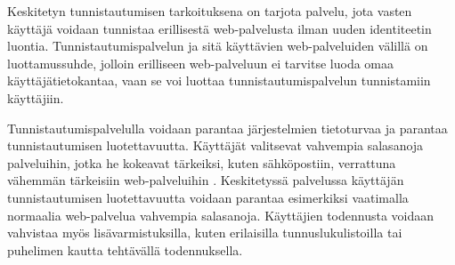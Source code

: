 Keskitetyn tunnistautumisen tarkoituksena on tarjota palvelu, jota vasten käyttäjä voidaan tunnistaa erillisestä web-palvelusta ilman uuden identiteetin luontia. Tunnistautumispalvelun ja sitä käyttävien web-palveluiden välillä on luottamussuhde, jolloin erilliseen web-palveluun ei tarvitse luoda omaa käyttäjätietokantaa, vaan se voi luottaa tunnistautumispalvelun tunnistamiin käyttäjiin.

Tunnistautumispalvelulla voidaan parantaa järjestelmien tietoturvaa ja parantaa tunnistautumisen luotettavuutta. Käyttäjät valitsevat vahvempia salasanoja palveluihin, jotka he kokeavat tärkeiksi, kuten sähköpostiin, verrattuna vähemmän tärkeisiin web-palveluihin \cite{password_habits}. Keskitetyssä palvelussa käyttäjän tunnistautumisen luotettavuutta voidaan parantaa esimerkiksi vaatimalla normaalia web-palvelua vahvempia salasanoja. Käyttäjien todennusta voidaan vahvistaa myös lisävarmistuksilla, kuten erilaisilla tunnuslukulistoilla tai puhelimen kautta tehtävällä todennuksella.